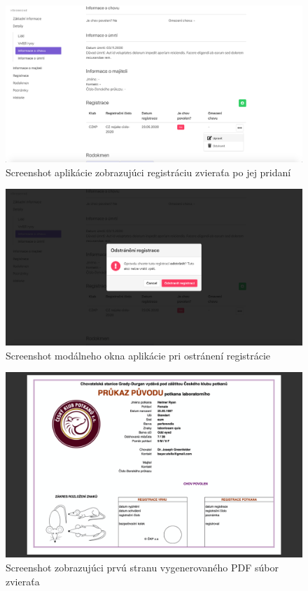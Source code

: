 \begin{figure}[H]
	\includegraphics[width=1.0\textwidth]{media/priloha/zviera/registracia/4.png}
	\caption{Screenshot aplikácie zobrazujúci registráciu zvieraťa po jej pridaní}
\end{figure}

\vspace*{\fill}

\begin{figure}[H]
	\includegraphics[width=1.0\textwidth]{media/priloha/zviera/registracia/5.png}
	\caption{Screenshot modálneho okna aplikácie pri ostránení registrácie}
\end{figure}

\begin{figure}[H]
	\includegraphics[width=1.0\textwidth]{media/priloha/vseobecne/pdf/1.png}
	\caption{Screenshot zobrazujúci prvú stranu vygenerovaného PDF súbor zvieraťa}
\end{figure}

